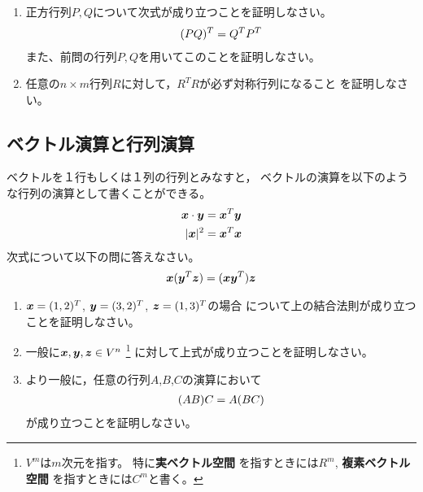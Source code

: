 \documentclass[twocolumn,11pt]{jarticle}
\begin{document}
\question
\begin{enumerate}
\item 正方行列$P,Q$について次式が成り立つことを証明しなさい。
  \begin{align}
    (PQ)^T=Q^TP^T\notag
  \end{align}
  また、前問の行列$P,Q$を用いてこのことを証明しなさい。
\item 任意の$n\times m$行列$R$に対して，$R^TR$が必ず対称行列になること
  を証明しなさい。
\end{enumerate}%

\subsection{ベクトル演算と行列演算\prog}
ベクトルを１行もしくは１列の行列とみなすと，
ベクトルの演算を以下のような行列の演算として書くことができる。
\begin{align}
\boldsymbol{x}\cdot\boldsymbol{y}&=\boldsymbol{x}^T\boldsymbol{y}\notag\\
|\boldsymbol{x}|^2 &=  \boldsymbol{x}^T\boldsymbol{x}\notag
\end{align}
\question
次式について以下の問に答えなさい。
\begin{align}
  \boldsymbol{x}(\boldsymbol{y}^T\boldsymbol{z})= (\boldsymbol{x}\boldsymbol{y}^T)\boldsymbol{z}\notag
\end{align}
\begin{enumerate}
\item $\boldsymbol{x}=(1,2)^T$, $\boldsymbol{y}=(3,2)^T$, $\boldsymbol{z}=(1,3)^T$の場合
  について上の結合法則が成り立つことを証明しなさい。
\item 一般に$\boldsymbol{x}, \boldsymbol{y},\boldsymbol{z}\in V^n$
\footnote{
  $V^m$は$m$次元を指す。
  特に\textbf{実ベクトル空間}
  を指すときには$R^m$, 
  \textbf{複素ベクトル空間}
  を指すときには$C^m$と書く。}
に対して上式が成り立つことを証明しなさい。
\item より一般に，任意の行列$A$,$B$,$C$の演算において 
  \begin{align}
    (AB)C=A(BC)\notag
  \end{align}
  が成り立つことを証明しなさい。
\end{enumerate}

% 
\end{document}
